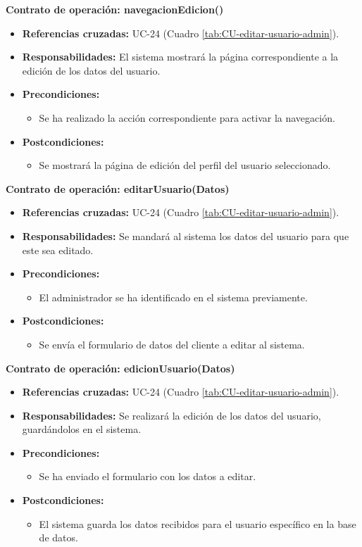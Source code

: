 \textbf{Contrato de operación: navegacionEdicion()}
\begin{itemize}
\item \textbf{Referencias cruzadas:} UC-24 (Cuadro \ref{tab:CU-editar-usuario-admin}).
\item \textbf{Responsabilidades:} El sistema mostrará la página correspondiente a la edición de los datos del usuario.
\item \textbf{Precondiciones:} 
 \begin{itemize}
\item Se ha realizado la acción correspondiente para activar la navegación.
\end {itemize}
\item \textbf{Postcondiciones:} 
 \begin{itemize}
\item Se mostrará la página de edición del perfil del usuario seleccionado.
\end {itemize}
\end {itemize}

\textbf{Contrato de operación: editarUsuario(Datos)}
\begin{itemize}
\item \textbf{Referencias cruzadas:} UC-24 (Cuadro \ref{tab:CU-editar-usuario-admin}).
\item \textbf{Responsabilidades:} Se mandará al sistema los datos del usuario para que este sea editado.
\item \textbf{Precondiciones:} 
 \begin{itemize}
\item El administrador se ha identificado en el sistema previamente.
\end {itemize}
\item \textbf{Postcondiciones:} 
 \begin{itemize}
\item Se envía el formulario de datos del cliente a editar al sistema.
\end {itemize}
\end {itemize}

\textbf{Contrato de operación: edicionUsuario(Datos)}
\begin{itemize}
\item \textbf{Referencias cruzadas:} UC-24 (Cuadro \ref{tab:CU-editar-usuario-admin}).
\item \textbf{Responsabilidades:} Se realizará la edición de los datos del usuario, guardándolos en el sistema.
\item \textbf{Precondiciones:} 
 \begin{itemize}
\item Se ha enviado el formulario con los datos a editar.
\end {itemize}
\item \textbf{Postcondiciones:} 
 \begin{itemize}
\item El sistema guarda los datos recibidos para el usuario específico en la base de datos.
\end {itemize}
\end {itemize}


